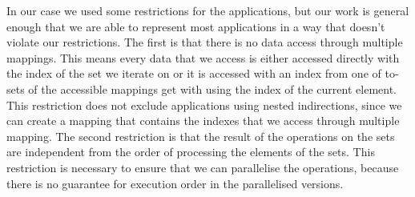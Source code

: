 In our case we used some restrictions for the applications, but our work is
general enough that we are able to represent most applications in a way that
doesn't violate our restrictions. The first is that there is no data access
through multiple mappings. This means every data that we access is either
accessed directly with the index of the set we iterate on or it is accessed
with an index from one of to-sets of the accessible mappings get with using the
index of the current element. This restriction does not exclude applications
using nested indirections, since we can create a mapping that contains the
indexes that we access through multiple mapping. The second restriction is that
the result of the operations on the sets are independent from the order of
processing the elements of the sets. This restriction is necessary to ensure
that we can parallelise the operations, because there is no guarantee for
execution order in the parallelised versions.

